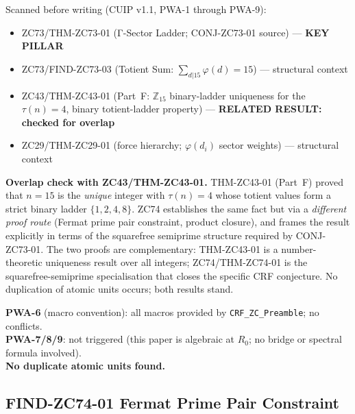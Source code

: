 \documentclass[12pt, a4paper]{article}
\begin{document}
\begin{formalbox}[title={Pre-Work Audit Record --- ZC74}]
Scanned before writing (CUIP v1.1, PWA-1 through PWA-9):
\begin{itemize}[leftmargin=2em, noitemsep]
  \item ZC73/THM-ZC73-01 (Γ-Sector Ladder; CONJ-ZC73-01 source)
    --- \textbf{KEY PILLAR}
  \item ZC73/FIND-ZC73-03 (Totient Sum: $\sum_{d|15}\varphi(d)=15$)
    --- structural context
  \item ZC43/THM-ZC43-01 (Part~F: $\mathbb{Z}_{15}$ binary-ladder uniqueness
    for the $\tau(n)=4$, binary totient-ladder property)
    --- \textbf{RELATED RESULT: checked for overlap}
  \item ZC29/THM-ZC29-01 (force hierarchy; $\varphi(d_i)$ sector weights)
    --- structural context
\end{itemize}

\textbf{Overlap check with ZC43/THM-ZC43-01.}
THM-ZC43-01 (Part~F) proved that $n = 15$ is the \emph{unique}
integer with $\tau(n) = 4$ whose totient values form a strict
binary ladder $\{1, 2, 4, 8\}$.
ZC74 establishes the same fact but via a \emph{different proof route}
(Fermat prime pair constraint, product closure), and frames the
result explicitly in terms of the squarefree semiprime structure
required by CONJ-ZC73-01.
The two proofs are complementary: THM-ZC43-01 is a number-theoretic
uniqueness result over all integers; ZC74/THM-ZC74-01 is the
squarefree-semiprime specialisation that closes the specific CRF
conjecture.
No duplication of atomic units occurs; both results stand.

\textbf{PWA-6} (macro convention): all macros provided by
\texttt{CRF\_ZC\_Preamble}; no conflicts.\\
\textbf{PWA-7/8/9}: not triggered (this paper is algebraic at $R_0$;
no bridge or spectral formula involved).\\
\textbf{No duplicate atomic units found.}
\end{formalbox}

\newpage

\subsection{FIND-ZC74-01 \quad Fermat Prime Pair Constraint}
\label{sec:find01}
\end{document}
